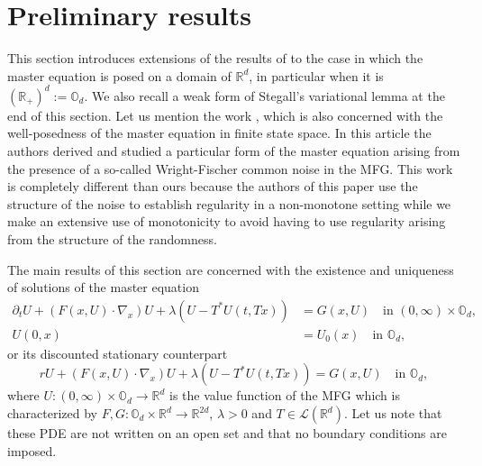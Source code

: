 \documentclass[JEP,XML,SOM,Unicode,NoEqCountersInSection,published]{cedram}
\let\mathcal\mathscr
\theoremstyle{definition}
\begin{document}
\section{Preliminary results}\label{sec:1}
This section introduces extensions of the results of \cite{lions2007cours} to the case in which the master equation is posed on a domain of $\mathbb{R}^d$, in particular when it is $(\mathbb{R}_+)^d:= \mathbb{O}_d$. We also recall a weak form of Stegall's variational lemma at the end of this section. Let us mention the work \cite{bayraktar2019finite}, which is also concerned with the well-posedness of the master equation in finite state space. In this article the authors derived and studied a particular form of the master equation arising from the presence of a so-called Wright-Fischer common noise in the MFG. This work is completely different than ours because the authors of this paper use the structure of the noise to establish regularity in a non-monotone setting while we make an extensive use of monotonicity to avoid having to use regularity arising from the structure of the randomness.

The main results of this section are concerned with the existence and uniqueness of solutions of the master equation
\begin{equation}\label{me}
\begin{aligned}
\partial_t U+(F(x,U)\cdot \nabla_x)U+\lambda (U-T^*U(t,Tx))&= G(x,U) \quad\text{in } (0,\infty) \times \mathbb{O}_d,\\
U(0,x) &= U_0(x) \quad\text{in } \mathbb{O}_d,
\end{aligned}
\end{equation}
or its discounted stationary counterpart
\begin{equation}\label{sme}
r U+(F(x,U)\cdot \nabla_x)U+\lambda (U-T^*U(t,Tx))= G(x,U) \quad\text{in } \mathbb{O}_d,
\end{equation}
where $U: (0,\infty)\times \mathbb{O}_d \to \mathbb{R}^d$ is the value function of the MFG which is characterized by $F, G: \mathbb{O}_d \times \mathbb{R}^d\to \mathbb{R}^{2d}$, $\lambda > 0$ and $T \in \mathcal{L}(\mathbb{R}^d)$. Let us note that these PDE are not written on an open set and that no boundary conditions are imposed.
\end{document}
